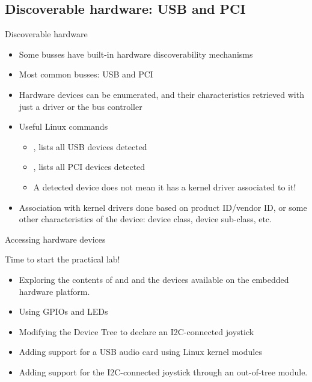\subsection{Discoverable hardware: USB and PCI}

\begin{frame}{Discoverable hardware}
  \begin{itemize}
  \item Some busses have built-in hardware discoverability mechanisms
  \item Most common busses: USB and PCI
  \item Hardware devices can be enumerated, and their characteristics
    retrieved with just a driver or the bus controller
  \item Useful Linux commands
    \begin{itemize}
    \item {}, lists all USB devices detected
    \item {}, lists all PCI devices detected
    \item A detected device does not mean it has a kernel driver
      associated to it!
    \end{itemize}
  \item Association with kernel drivers done based on product
    ID/vendor ID, or some other characteristics of the device: device
    class, device sub-class, etc.
  \end{itemize}
\end{frame}


\setuplabframe
{Accessing hardware devices}
{
  Time to start the practical lab!
  \begin{itemize}
  \item Exploring the contents of  and  and the
    devices available on the embedded hardware platform.
  \item Using GPIOs and LEDs
  \item Modifying the Device Tree to declare an I2C-connected
        joystick
  \item Adding support for a USB audio card using Linux kernel modules
  \item Adding support for the I2C-connected joystick through
        an out-of-tree module.
  \end{itemize}
}
